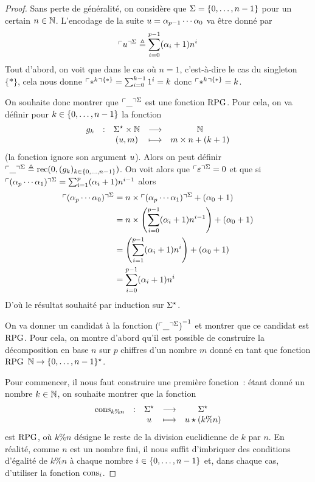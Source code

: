 \begin{proof}
  Sans perte de généralité, on considère que $\Sigma=\{0,\ldots,n - 1\}$ pour un
  certain $n \in \mathbb N$. L'encodage de la suite
  $u = \alpha_{p-1}\cdots \alpha_0$ va être donné par
  \[\ulcorner u\urcorner^{\Sigma} \triangleq \sum_{i = 0}^{p-1} (\alpha_i + 1) n^i\]
  Tout d'abord, on voit que dans le cas où $n = 1$, c'est-à-dire le cas du
  singleton $\{*\}$, cela nous donne
  $\ulcorner*^k\urcorner^{\{*\}} = \sum_{i = 0}^{k-1} 1^i = k$
  donc $\ulcorner*^k\urcorner^{\{*\}} = k$.

  On souhaite donc montrer que $\ulcorner\mathord{\_}\urcorner^{\Sigma}$ est une fonction $\operatorname{RPG}$.
  Pour cela, on va définir pour $k \in \{0,\ldots,n - 1\}$ la fonction
  \[\makeFun{g_k}{\toStA\times\bN}{\bN}
            {(\varwd,m)}{m \times n + (k + 1)}\]
  (la fonction ignore son argument $u$).
  Alors on peut définir
  $\ulcorner\mathord{\_}\urcorner^{\Sigma} \triangleq \operatorname{rec}(0,(g_k)_{k\in\{0,\ldots,n - 1\}})$.
  On voit alors que $\ulcorner\varepsilon\urcorner^{\Sigma} = 0$ et que si
  $\ulcorner(\alpha_p\cdots\alpha_1)\urcorner^{\Sigma}=\sum_{i=1}^{p}(\alpha_i+1)n^{i-1}$
  alors
  \begin{align*}
    \ulcorner(\alpha_p\cdots\alpha_0)\urcorner^{\Sigma}
    &= n \times \ulcorner(\alpha_p\cdots \alpha_1)\urcorner^{\Sigma} + (\alpha_0 + 1)\\
    &= n \times \left(\sum_{i = 0}^{p-1}(\alpha_i+1) n^{i-1}\right)+(\alpha_0+1)\\
    &= \left(\sum_{i = 1}^{p-1} (\alpha_i+1) n^i\right) + (\alpha_0+1)\\
    &= \sum_{i = 0}^{p-1} (\alpha_i + 1) n^i\\
  \end{align*}
  D'où le résultat souhaité par induction sur $\Sigma^{\star}$.
  
  On va donner un candidat à la fonction ${(\ulcorner\mathord{\_}\urcorner^{\Sigma})}^{-1}$ et
  montrer que ce candidat est $\operatorname{RPG}$. Pour cela, on montre d'abord qu'il est
  possible de construire la décomposition en base $n$ sur $p$ chiffres d'un
  nombre $m$ donné en tant que fonction $\operatorname{RPG}$ $\mathbb N \to \{0,\ldots,n - 1\}^{\star}$.
  
  Pour commencer, il nous faut construire une première fonction~: étant donné un
  nombre $k \in \mathbb N$, on souhaite montrer que la fonction
  \[\makeFun{\consP{k\%n}}{\toStA}{\toStA}{\varwd}{\varwd\wdPt(k\%n)}\]
  est $\operatorname{RPG}$, où $k \% n$ désigne le reste de la division euclidienne de $k$ par
  $n$. En réalité, comme $n$ est un nombre fini, il nous suffit d'imbriquer des
  conditions d'égalité de $k \% n$ à chaque nombre $i\in\{0,\ldots,n - 1\}$ et,
  dans chaque cas, d'utiliser la fonction $\operatorname{cons}_{i}$.
  

\end{proof}
